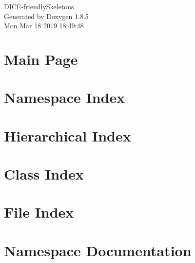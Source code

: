 \documentclass[twoside]{book}
\newcommand{\clearemptydoublepage}{%
  \newpage{\pagestyle{empty}\cleardoublepage}%
}
\begin{document}
\hypersetup{pageanchor=false}
\begin{titlepage}
\vspace*{7cm}
\begin{center}%
{\Large D\-I\-C\-E-\/friendly\-Skeletons }\\
\vspace*{1cm}
{\large Generated by Doxygen 1.8.5}\\
\vspace*{0.5cm}
{\small Mon Mar 18 2019 18:49:48}\\
\end{center}
\end{titlepage}
\clearemptydoublepage
\tableofcontents
\clearemptydoublepage
{}
\hypersetup{pageanchor=true}

\chapter{Main Page}
\label{index}\hypertarget{index}{}
\chapter{Namespace Index}

\chapter{Hierarchical Index}

\chapter{Class Index}

\chapter{File Index}

\chapter{Namespace Documentation}






\end{document}
